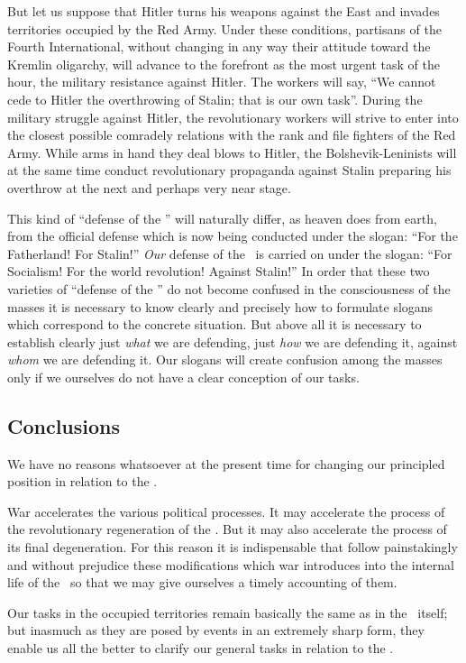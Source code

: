 But let us suppose that Hitler turns his weapons against the East and invades territories occupied by the Red Army. Under these conditions, partisans of the Fourth International, without changing in any way their attitude toward the Kremlin oligarchy, will advance to the forefront as the most urgent task of the hour, the military resistance against Hitler. The workers will say, “We cannot cede to Hitler the overthrowing of Stalin; that is our own task”. During the military struggle against Hitler, the revolutionary workers will strive to enter into the closest possible comradely relations with the rank and file fighters of the Red Army. While arms in hand they deal blows to Hitler, the Bolshevik-Leninists will at the same time conduct revolutionary propaganda against Stalin preparing his overthrow at the next and perhaps very near stage.

This kind of “defense of the \USSR” will naturally differ, as heaven does from earth, from the official defense which is now being conducted under the slogan: “For the Fatherland! For Stalin!” \emph{Our} defense of the \USSR\ is carried on under the slogan: “For Socialism! For the world revolution! Against Stalin!” In order that these two varieties of “defense of the \USSR” do not become confused in the consciousness of the masses it is necessary to know clearly and precisely how to formulate slogans which correspond to the concrete situation. But above all it is necessary to establish clearly just \emph{what} we are defending, just \emph{how} we are defending it, against \emph{whom} we are defending it. Our slogans will create confusion among the masses only if we ourselves do not have a clear conception of our tasks.

\subsection*{Conclusions}

We have no reasons whatsoever at the present time for changing our principled position in relation to the \USSR.

War accelerates the various political processes. It may accelerate the process of the revolutionary regeneration of the \USSR. But it may also accelerate the process of its final degeneration. For this reason it is indispensable that follow painstakingly and without prejudice these modifications which war introduces into the internal life of the \USSR\ so that we may give ourselves a timely accounting of them.

Our tasks in the occupied territories remain basically the same as in the \USSR\ itself; but inasmuch as they are posed by events in an extremely sharp form, they enable us all the better to clarify our general tasks in relation to the \USSR.

